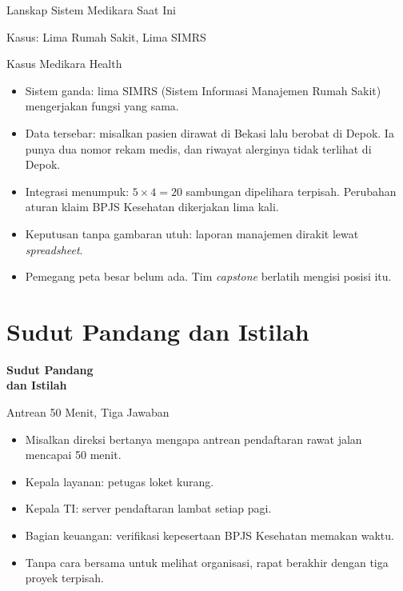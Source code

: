 \documentclass[aspectratio=169, table, 12pt]{beamer}
\begin{document}
\begin{frame}{{\Large Lanskap Sistem Medikara Saat Ini}}
  \centering
\end{frame}

\begin{frame}{{\Large Kasus: Lima Rumah Sakit, Lima SIMRS}}
  \begin{block}{Kasus Medikara Health}
    \small
    \begin{itemize}
      \item Sistem ganda: lima SIMRS (Sistem Informasi Manajemen Rumah Sakit) mengerjakan fungsi yang
            sama.
      \item Data tersebar: misalkan pasien dirawat di Bekasi lalu berobat di Depok. Ia punya dua nomor
            rekam medis, dan riwayat alerginya tidak terlihat di Depok.
      \item Integrasi menumpuk: $5 \times 4 = 20$ sambungan dipelihara terpisah. Perubahan aturan klaim
            BPJS Kesehatan dikerjakan lima kali.
      \item Keputusan tanpa gambaran utuh: laporan manajemen dirakit lewat \textit{spreadsheet}.
      \item Pemegang peta besar belum ada. Tim \textit{capstone} berlatih mengisi posisi itu.
    \end{itemize}
  \end{block}
\end{frame}

\section{Sudut Pandang dan Istilah}

\begin{frame}{\hfill}
  \centering
  \Huge{\textbf{Sudut Pandang\\dan Istilah}}
\end{frame}

\begin{frame}{{\Large Antrean 50 Menit, Tiga Jawaban}}
  \vspace{10pt}
  \begin{itemize}
    \item Misalkan direksi bertanya mengapa antrean pendaftaran rawat jalan mencapai 50 menit.
    \item Kepala layanan: petugas loket kurang.
    \item Kepala TI: server pendaftaran lambat setiap pagi.
    \item Bagian keuangan: verifikasi kepesertaan BPJS Kesehatan memakan waktu.
    \item Tanpa cara bersama untuk melihat organisasi, rapat berakhir dengan tiga proyek terpisah.
  \end{itemize}
\end{frame}
\end{document}
